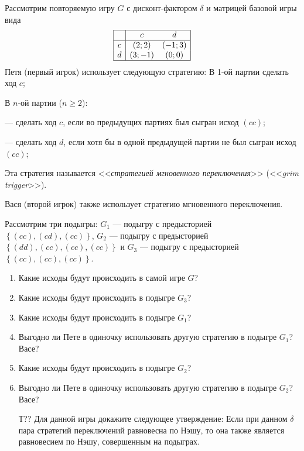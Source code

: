 \begin{problem}

Рассмотрим повторяемую игру  $G$  с дисконт-фактором  $\delta $  и матрицей базовой игры вида
\[\begin{array}{|c|cc|}  \hline {} & {c} & {d} \\  \hline {c} & {(2;2)} & {(-1;3)} \\ {d} & {(3;-1)} & {(0;0)} \\  \hline  \end{array}\]
Петя (первый игрок) использует следующую стратегию:
В 1-ой партии сделать ход  $c$;

В  $n$-ой партии ($n\ge 2$):

       --- сделать ход  $c$, если во  предыдущих партиях был сыгран исход  $\left(cc\right)$;

       --- сделать ход  $d$, если хотя бы в одной предыдущей партии не был сыгран исход  $\left(cc\right)$;

Эта стратегия называется <<{\it стратегией мгновенного переключения}>> (<<{\it grim trigger}>>).

Вася (второй игрок) также использует стратегию мгновенного переключения.

Рассмотрим три подыгры:  $G_{1} $  --- подыгру с предысторией  $\left\{\left(cc\right),\left(cd\right),\left(cc\right)\right\}$,  $G_{2} $  --- подыгру с предысторией  $\left\{\left(dd\right),\left(cc\right),\left(cc\right),\left(cc\right)\right\}$  и  $G_{3} $  --- подыгру с предысторией  $\left\{\left(cc\right),\left(cc\right),\left(cc\right)\right\}$.
\begin{enumerate}
\item  Какие исходы будут происходить в самой игре  $G$?\par
\item Какие исходы будут происходить в подыгре  $G_{3} $?\par
\item  Какие исходы будут происходить в подыгре  $G_{1} $?\par
\item Выгодно ли Пете в одиночку использовать другую стратегию в подыгре  $G_{1} $? Васе?\par
\item Какие исходы будут происходить в подыгре  $G_{2} $?\par
\item Выгодно ли Пете в одиночку использовать другую стратегию в подыгре  $G_{2} $? Васе?\par
{}
\item [Т??] Для данной игры докажите следующее утверждение:
Если при данном  $\delta $  пара стратегий переключений равновесна по Нэшу, то она также является равновесием по Нэшу, совершенным на подыграх.
\end{enumerate}


\begin{sol}

\end{sol}
\end{problem}



